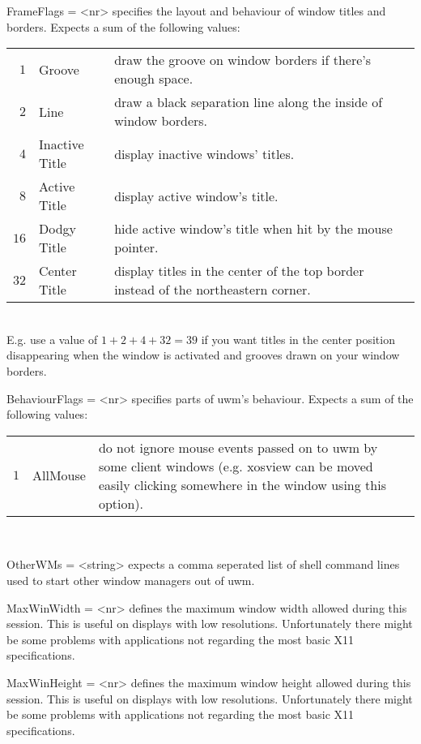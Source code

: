 \documentclass[10pt,a4paper]{article}
\newenvironment{ttdesc}[1]{
   \begin{list}{}{
          \renewcommand{\makelabel}[1]{\texttt{##1\hfill}}}}{\end{list}}
\begin{document}
\begin{ttdesc}{description}
\item[FrameFlags = <nr>] specifies the layout and behaviour of window titles and borders. Expects a sum of the following values:\\
\begin{tabular}{rlp{7cm}l}
$1$  & Groove & draw the groove on window borders if there's enough space.\\
$2$  & Line & draw a black separation line along the inside of window borders.\\
$4$  & Inactive Title & display inactive windows' titles.\\
$8$  & Active Title & display active window's title.\\
$16$ & Dodgy Title & hide active window's title when hit by the mouse pointer.\\
$32$ & Center Title & display titles in the center of the top border instead of the northeastern corner.\\
\end{tabular}\\
E.g. use a value of $1+2+4+32=39$ if you want titles in the center position disappearing when the window is activated and grooves drawn on your window borders. 

\item[BehaviourFlags = <nr>] specifies parts of uwm's behaviour. Expects a sum of the following values:\\
\begin{tabular}{rlp{7cm}l}
$1$  & AllMouse & do not ignore mouse events passed on to uwm by some client windows (e.g. xosview can be moved easily clicking somewhere in the window using this option).\\
\end{tabular}\\

\item[OtherWMs = <string>] expects a comma seperated list of shell command lines used to start other window managers out of uwm.

\item[MaxWinWidth = <nr>] defines the maximum window width allowed during this session. This is useful on displays with low resolutions. Unfortunately there might be some problems with applications not regarding the most basic X11 specifications.

\item[MaxWinHeight = <nr>] defines the maximum window height allowed during this session. This is useful on displays with low resolutions. Unfortunately there might be some problems with applications not regarding the most basic X11 specifications.


\end{ttdesc}
\end{document}
